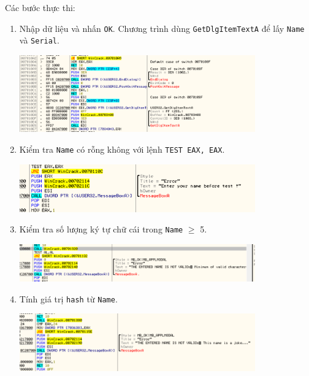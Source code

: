 Các bước thực thi:
\begin{enumerate}[label=\textbf{Bước \arabic*:}]
    \item Nhập dữ liệu và nhấn \texttt{OK}. Chương trình dùng \texttt{GetDlgItemTextA} để lấy \texttt{Name} và \texttt{Serial}.
    \begin{center}
        \includegraphics[width=0.8\textwidth]{img/file-2/asm3.PNG}
    \end{center}

    \item Kiểm tra \texttt{Name} có rỗng không với lệnh \texttt{TEST EAX, EAX}.
    \begin{center}
        \includegraphics[width=0.8\textwidth]{img/file-2/asm4.PNG}
    \end{center}

    \item Kiểm tra số lượng ký tự chữ cái trong \texttt{Name} $\geq$ 5.
    \begin{center}
        \includegraphics[width=0.8\textwidth]{img/file-2/asm5.PNG}
    \end{center}

    \item Tính giá trị \texttt{hash} từ \texttt{Name}.
    \begin{center}
        \includegraphics[width=0.8\textwidth]{img/file-2/asm6.PNG}
    \end{center}


\end{enumerate}
